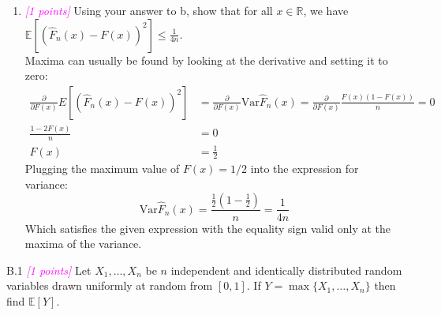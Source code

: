\documentclass{article}
\newcommand{\field}[1]{\mathbb{#1}}
\newcommand{\1}{\mathbf{1}}
\newcommand{\E}{\mathbb{E}}
\newcommand{\R}{\field{R}} %
\newcommand{\points}[1]{\small\textcolor{magenta}{\emph{[#1 points]}} \normalsize}
\begin{document}
\begin{enumerate}
  \item \points{1} Using your answer to b, show that
    for all $x\in \R$, we have  $\displaystyle \E[ ( \widehat{F}_n(x) - F(x) )^2 ] \leq \tfrac{1}{4n}$.\\
    Maxima can usually be found by looking at the derivative and setting it to zero:
    \begin{align*}
         \frac{\partial}{\partial F(x)} E[ ( \widehat{F}_n(x) - F(x) )^2 ] &= \frac{\partial}{\partial F(x)} \text{Var} \widehat{F}_n(x) = \frac{\partial}{\partial F(x)} \frac{F(x)\left(1-F(x)\right)}{n} = 0 \\
          \frac{1 - 2F(x)}{n} &= 0 \\
          F(x) &= \frac{1}{2}
    \end{align*} 
    Plugging the maximum value of $F(x)=1/2$ into the expression for variance:
    $$\text{Var} \widehat{F}_n(x) = \frac{\frac{1}{2}\left(1-\frac{1}{2}\right)}{n} = \frac{1}{4n} $$
    Which satisfies the given expression with the equality sign valid only at the maxima of the variance. 
    \end{enumerate}

B.1  \points{1} Let $X_1,\dots,X_n$ be $n$ independent and identically distributed random variables drawn uniformly at random from $[0,1]$. If $Y = \max\{X_1,\dots,X_n\}$ then find $\E[Y]$.\\
\end{document}
